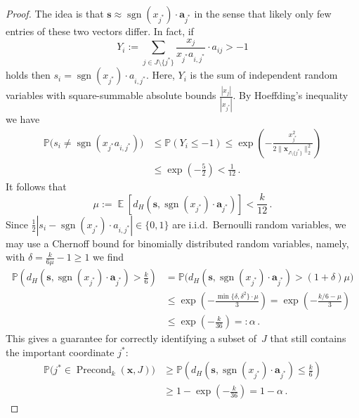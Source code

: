 \documentclass[10pt,a4paper]{amsart}
\renewcommand{\P}{{\mathbb P}}
\newcommand{\expect}{\operatorname{\mathbb{E}}}
\DeclareMathOperator{\precond}{Precond}
\DeclareMathOperator{\sgn}{sgn}
\renewcommand{\vec}{\boldsymbol}
\begin{document}
\begin{proof}
    The idea is that $\vec{s} \approx \sgn(x_{j^\ast}) \cdot \vec{a}_{j^\ast}$
    in the sense that likely only few entries of these two vectors differ.
    In fact, if
    \begin{equation*}
        Y_i := \sum_{j \in J \setminus\{j^\ast\}} 
                    \frac{x_j}{x_{j^\ast}a_{i,j^\ast}} \cdot a_{ij}
            > -1
    \end{equation*}
    holds then $s_i = \sgn(x_{j^\ast}) \cdot a_{i,j^\ast}$.
    Here, $Y_i$ is the sum of independent random variables with square-summable absolute bounds $\frac{|x_j|}{|x_{j^\ast}|}$. By Hoeffding's inequality we have
    \begin{align*}
        \P\bigl(s_i \neq \sgn(x_{j^\ast} a_{i,j^\ast})\bigr)
            &\leq \P(Y_i \leq -1)
            \leq \exp\left(-\frac{x_{j^\ast}^2}{2\|\vec{x}_{J\setminus\{j^\ast\}}\|_2^2}\right)
            \\
            &\leq \exp\left(-\frac{5}{2}\right) < \frac{1}{12} \,.
    \end{align*}
    It follows that
    \begin{equation*}
        \mu := \expect \left[d_H(\vec{s}, \sgn(x_{j^\ast}) \cdot \vec{a}_{j^\ast})\right]
            < \frac{k}{12} \,.
    \end{equation*}
    Since 
    $\frac{1}{2}|s_i - \sgn(x_{j^\ast}) \cdot a_{i,j^\ast}| \in \{0,1\}$
    are i.i.d.\ Bernoulli random variables,
    we may use a Chernoff bound for binomially distributed random variables,
    namely, with $\delta = \frac{k}{6\mu} - 1 \geq 1$ we find
    \begin{align*}
        \P\left(d_H(\vec{s}, \sgn(x_{j^\ast}) \cdot \vec{a}_{j^\ast})
                > \frac{k}{6}\right)
            &= \P\bigl(d_H(\vec{s}, \sgn(x_{j^\ast}) \cdot \vec{a}_{j^\ast})
                > (1+\delta)\mu\bigr) \\
            &\leq \exp\left(- \frac{\min\{\delta,\delta^2\} \cdot \mu}{3}\right)
            = \exp\left(- \frac{k/6 - \mu}{3}\right) \\
            &\leq \exp\left(-\frac{k}{36}\right) =: \alpha \,.
    \end{align*}
    This gives a guarantee for correctly identifying a subset of~$J$ that still contains the important coordinate $j^\ast$:
    \begin{align}
        \P\bigl(j^\ast \in \precond_k(\vec{x},J)\bigr)
            &\geq \P\left(d_H(\vec{s}, \sgn(x_{j^\ast}) \cdot \vec{a}_{j^\ast})
                \leq \frac{k}{6}\right)
                \nonumber \\
            &\geq 1 - \exp\left(-\frac{k}{36}\right)
            = 1 - \alpha \,.
            \label{eq:precondtrue}
    \end{align}


\end{proof}
\end{document}
